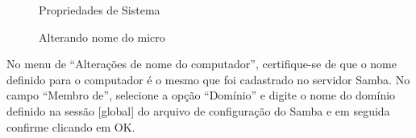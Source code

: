 \begin{enumerate}
{	\begin{figure}[ht]
   			\centering
   			\caption{Propriedades de Sistema}
    		\label{propriedades_do_sistema}
	\end{figure}

	\begin{figure}[ht]
   			\centering
   			\caption{Alterando nome do micro}
    		\label{alterar_nome_micro}
	\end{figure}

\item {No menu de “Alterações de nome do computador”, certifique-se de que o nome definido para o computador é o mesmo que foi cadastrado no servidor Samba. No campo “Membro de”, selecione a opção “Domínio” e digite o nome do domínio definido na sessão [global] do arquivo de configuração do Samba e em seguida confirme clicando em OK.}

}
\end{enumerate}
